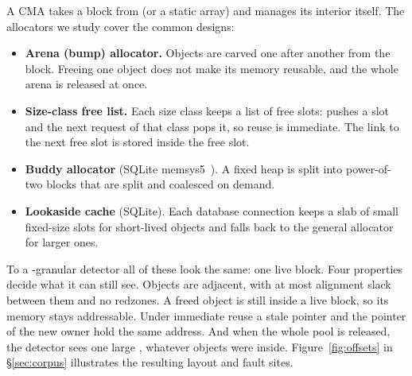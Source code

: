 A CMA takes a block from  (or a static array) and manages its interior itself. The allocators we study cover the common designs:
\begin{itemize}
\item \textbf{Arena (bump) allocator.} Objects are carved one after another from the block. Freeing one object does not make its memory reusable, and the whole arena is released at once.
\item \textbf{Size-class free list.} Each size class keeps a list of free slots:  pushes a slot and the next request of that class pops it, so reuse is immediate. The link to the next free slot is stored inside the free slot.
\item \textbf{Buddy allocator} (SQLite memsys5~\cite{sqlitemalloc}). A fixed heap is split into power-of-two blocks that are split and coalesced on demand.
\item \textbf{Lookaside cache} (SQLite). Each database connection keeps a slab of small fixed-size slots for short-lived objects and falls back to the general allocator for larger ones.
\end{itemize}
To a -granular detector all of these look the same: one live block. Four properties decide what it can still see. Objects are adjacent, with at most alignment slack between them and no redzones. A freed object is still inside a live block, so its memory stays addressable. Under immediate reuse a stale pointer and the pointer of the new owner hold the same address. And when the whole pool is released, the detector sees one large , whatever objects were inside. Figure~\ref{fig:offsets} in \S\ref{sec:corpus} illustrates the resulting layout and fault sites.
